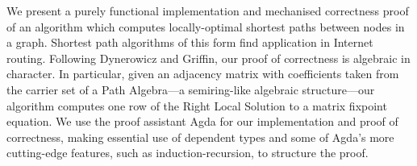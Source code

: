 We present a purely functional implementation and mechanised correctness proof of an algorithm which computes locally-optimal shortest paths between nodes in a graph.
Shortest path algorithms of this form find application in Internet routing.
Following Dynerowicz and Griffin, our proof of correctness is algebraic in character.
In particular, given an adjacency matrix with coefficients taken from the carrier set of a Path Algebra---a semiring-like algebraic structure---our algorithm computes one row of the Right Local Solution to a matrix fixpoint equation.
We use the proof assistant Agda for our implementation and proof of correctness, making essential use of dependent types and some of Agda's more cutting-edge features, such as induction-recursion, to structure the proof.


